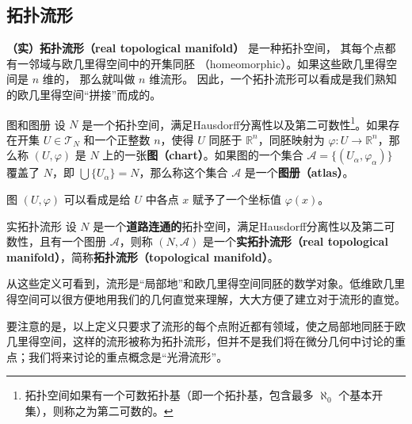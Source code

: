 

\subsection{拓扑流形}

\textbf{（实）拓扑流形（real topological manifold）} 是一种拓扑空间， 其每个点都有一邻域与欧几里得空间中的开集同胚 （homeomorphic）。如果这些欧几里得空间是 $n$ 维的， 那么就叫做 $n$ 维流形。 因此，一个拓扑流形可以看成是我们熟知的欧几里得空间“拼接”而成的。

\begin{definition}{图和图册}\label{def_Manif_1}
设 $N$ 是一个拓扑空间，满足Hausdorff分离性以及第二可数性\footnote{拓扑空间如果有一个可数拓扑基（即一个拓扑基，包含最多 $\aleph_0$ 个基本开集），则称之为第二可数的。}。如果存在开集 $U\in\mathcal{T}_N$ 和一个正整数 $n$，使得 $U$ 同胚于 $\mathbb{R}^n$，同胚映射为 $\varphi:U\rightarrow\mathbb{R}^n$，那么称 $(U,\varphi)$ 是 $N$ 上的一张\textbf{图（chart）}。如果图的一个集合 $\mathcal{A}=\{(U_\alpha, \varphi_\alpha)\}$ 覆盖了 $N$，即 $\bigcup\{U_\alpha\}=N$，那么称这个集合 $\mathcal{A}$ 是一个\textbf{图册（atlas）}。
\end{definition}

图 $(U, \varphi)$ 可以看成是给 $U$ 中各点 $x$ 赋予了一个坐标值 $\varphi(x)$。

\begin{definition}{实拓扑流形}\label{def_Manif_2}
设 $N$ 是一个\textbf{道路连通的}拓扑空间，满足Hausdorff分离性以及第二可数性，且有一个图册 $\mathcal{A}$，则称 $(N, \mathcal{A})$ 是一个\textbf{实拓扑流形（real topological manifold）}，简称\textbf{拓扑流形（topological manifold）}。

\end{definition}

从这些定义可看到，流形是“局部地”和欧几里得空间同胚的数学对象。低维欧几里得空间可以很方便地用我们的几何直觉来理解，大大方便了建立对于流形的直觉。

要注意的是，以上定义只要求了流形的每个点附近都有领域，使之局部地同胚于欧几里得空间，这样的流形被称为拓扑流形，但并不是我们将在微分几何中讨论的重点；我们将来讨论的重点概念是“光滑流形”。

